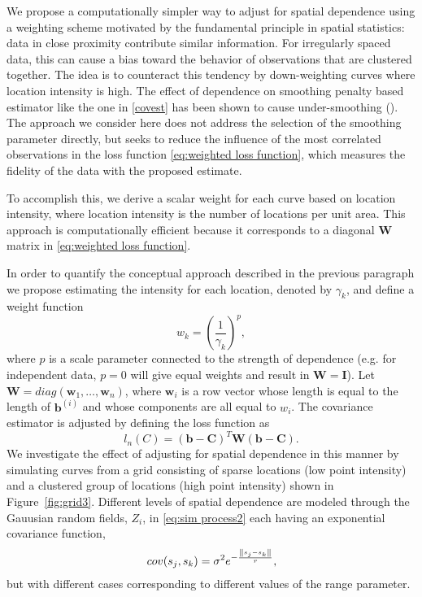 
We propose a computationally simpler way to adjust for spatial dependence using a weighting scheme motivated by the fundamental principle in spatial statistics: data in close proximity contribute similar information. For irregularly spaced data, this can cause a bias toward the behavior of observations that are clustered together. The idea is to counteract this tendency by down-weighting curves where location intensity is high. The effect of dependence on smoothing penalty based estimator like the one in \eqref{covest} has been shown to cause under-smoothing (\cite{Wang:1998tq}). The approach we consider here does not address the selection of the smoothing parameter directly, but seeks to reduce the influence of the most correlated observations in the loss function \eqref{eq:weighted loss function}, which measures the fidelity of the data with the proposed estimate.  

To accomplish this, we derive a scalar weight for each curve based on location intensity, where location intensity is the number of locations per unit area. This approach is computationally efficient because it corresponds to a diagonal $\mathbf{W}$ matrix in \eqref{eq:weighted loss function}. 

In order to quantify the conceptual approach described in the previous paragraph we propose estimating the intensity for each location, denoted by $\gamma_k$, and define a weight function 
\begin{equation}
	w_k = \left(\frac{1}{\gamma_k}\right)^p, 
\end{equation}
where $p$ is a scale parameter connected to the strength of dependence (e.g. for independent data, $p = 0$ will give equal weights and result in $\mathbf{W} = \mathbf{I}$).
Let $\mathbf{W}=diag(\mathbf{w}_1, \dots, \mathbf{w}_n)$, where $\mathbf{w}_i$ is a row vector whose length is equal to the length of $\mathbf{b}^{(i)}$ and whose components are all equal to $w_i$. The covariance estimator is adjusted by defining the loss function as 
\begin{equation}
	l_{n}(C)= (\mathbf{b} - \mathbf{C})^T\mathbf{W}(\mathbf{b} - \mathbf{C}). \label{eq:diag weighted loss function} 
\end{equation}
We investigate the effect of adjusting for spatial dependence in this manner by simulating curves from a grid consisting of sparse locations (low point intensity) and a clustered group of locations (high point intensity) shown in Figure~\ref{fig:grid3}. Different levels of spatial dependence are modeled through the Gauusian random fields, $Z_i$, in \eqref{eq:sim process2} each having an exponential covariance function, 
\begin{equation}
	cov(s_j, s_k) = \sigma^2e^{-\frac{\left\|s_j - s_k\right\|}{r}},\label{eq:exp cov}
\end{equation}
but with different cases corresponding to different values of the range parameter. 


